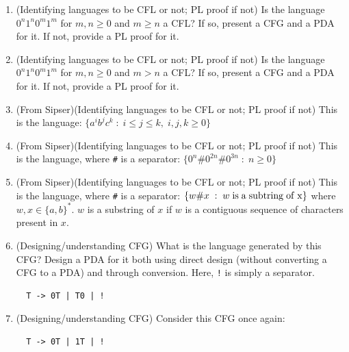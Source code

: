 \documentclass[12pt]{article}
\begin{document}
\begin{large}
\begin{enumerate}
\item (Identifying languages to be CFL or not; PL proof if not)
  Is the language $0^n 1^n 0^m 1^m$ for $m,n\ge 0$ and $m\ge n$ a CFL? If so, present a CFG and a PDA for it.
  If not, provide a PL proof for it.  
  
\item (Identifying languages to be CFL or not; PL proof if not)
  Is the language $0^n 1^n 0^m 1^m$ for $m,n\ge 0$ and $m>n$ a CFL? If so, present a CFG and a PDA for it.
  If not, provide a PL proof for it.

\item (From Sipser)(Identifying languages to be CFL or not; PL proof if not)
  This is the language:
  \( \{a^i b^j c^k \;:\; i\leq j\leq k,\; i,j,k\ge 0\} \)

\item (From Sipser)(Identifying languages to be CFL or not; PL proof if not)
  This is the language, where \verb|#| is a separator:
  \( \{0^n\# 0^{2n} \# 0^{3n} \;:\; n\ge 0\}\)

\item (From Sipser)(Identifying languages to be CFL or not; PL proof if not)
  This is the language, where \verb|#| is a separator:
  \( \{w\# x \;:\; w\; \rm{is} \; \rm{a}\; \rm{subtring}\; \rm{of}\; x\}\) where $w,x\in\{a,b\}^*$.
  $w$ is a substring of $x$ if $w$ is a contiguous sequence of characters present in $x$.

\item (Designing/understanding CFG) What is the language
  generated by this CFG? Design a PDA for it both using direct design (without
  converting a CFG to a PDA)
  and through conversion. Here, \verb|!| is simply a separator.
\begin{verbatim}
  T -> 0T | T0 | !
\end{verbatim}

\item \label{lin-qn}
  (Designing/understanding CFG) Consider this CFG once again:
\begin{verbatim}
  T -> 0T | 1T | !
\end{verbatim}


\end{enumerate}
\end{large}
\end{document}
